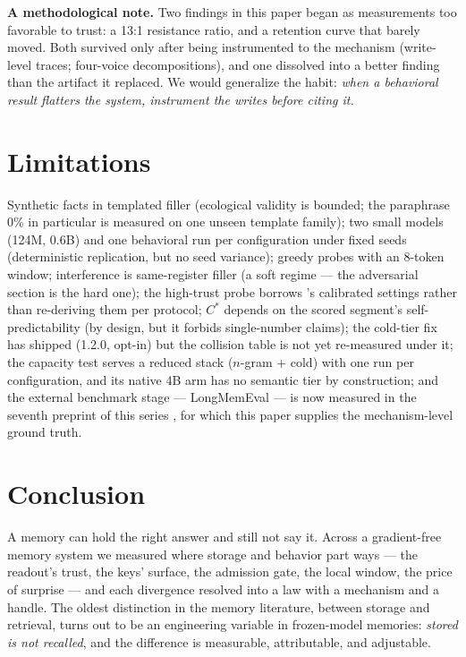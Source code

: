 \documentclass[11pt]{article}
\begin{document}
\textbf{A methodological note.} Two findings in this paper began as measurements too favorable to trust: a 13:1 resistance ratio, and a retention curve that barely moved. Both survived only after being instrumented to the mechanism (write-level traces; four-voice decompositions), and one dissolved into a better finding than the artifact it replaced. We would generalize the habit: \emph{when a behavioral result flatters the system, instrument the writes before citing it.}

\section{Limitations}

Synthetic facts in templated filler (ecological validity is bounded; the paraphrase 0\% in particular is measured on one unseen template family); two small models (124M, 0.6B) and one behavioral run per configuration under fixed seeds (deterministic replication, but no seed variance); greedy probes with an 8-token window; interference is same-register filler (a soft regime --- the adversarial section is the hard one); the high-trust probe borrows \cite{drafter}'s calibrated settings rather than re-deriving them per protocol; $C^{*}$ depends on the scored segment's self-predictability (by design, but it forbids single-number claims); the cold-tier fix has shipped (1.2.0, opt-in) but the collision table is not yet re-measured under it; the capacity test serves a reduced stack ($n$-gram + cold) with one run per configuration, and its native 4B arm has no semantic tier by construction; and the external benchmark stage --- LongMemEval \cite{longmemeval} --- is now measured in the seventh preprint of this series \cite{bench}, for which this paper supplies the mechanism-level ground truth.

\section{Conclusion}

A memory can hold the right answer and still not say it. Across a gradient-free memory system we measured where storage and behavior part ways --- the readout's trust, the keys' surface, the admission gate, the local window, the price of surprise --- and each divergence resolved into a law with a mechanism and a handle. The oldest distinction in the memory literature, between storage and retrieval, turns out to be an engineering variable in frozen-model memories: \emph{stored is not recalled}, and the difference is measurable, attributable, and adjustable.
\end{document}
